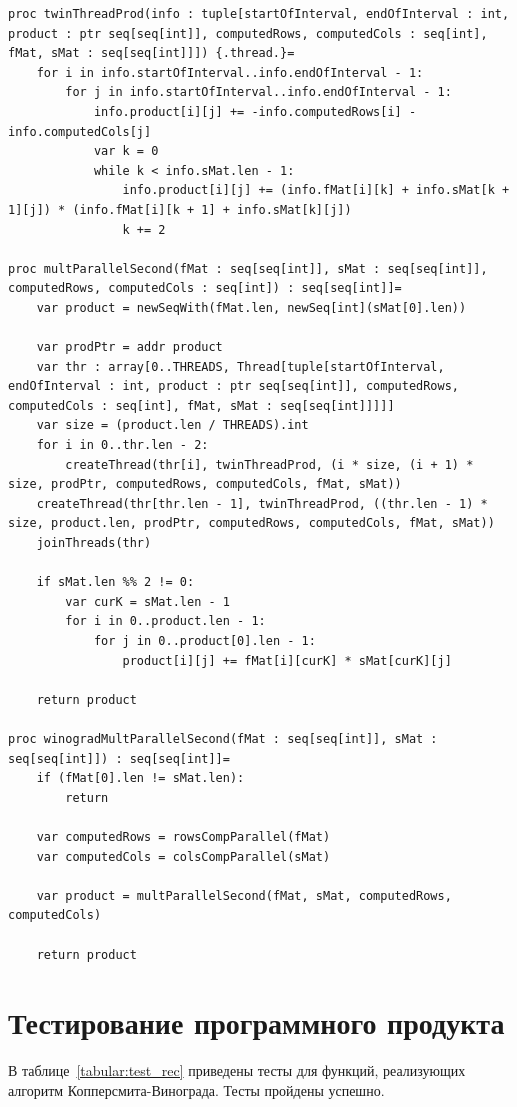 \documentclass[12pt]{report}
\begin{document}
\begin{lstlisting}[caption=Реализация второй схемы параллельного алгоритма Копперсмита-Винограда,
label={list:paral2}]
proc twinThreadProd(info : tuple[startOfInterval, endOfInterval : int, product : ptr seq[seq[int]], computedRows, computedCols : seq[int], fMat, sMat : seq[seq[int]]]) {.thread.}=
    for i in info.startOfInterval..info.endOfInterval - 1:
        for j in info.startOfInterval..info.endOfInterval - 1:
            info.product[i][j] += -info.computedRows[i] - info.computedCols[j]
            var k = 0
            while k < info.sMat.len - 1:
                info.product[i][j] += (info.fMat[i][k] + info.sMat[k + 1][j]) * (info.fMat[i][k + 1] + info.sMat[k][j])
                k += 2

proc multParallelSecond(fMat : seq[seq[int]], sMat : seq[seq[int]], computedRows, computedCols : seq[int]) : seq[seq[int]]=
    var product = newSeqWith(fMat.len, newSeq[int](sMat[0].len))

    var prodPtr = addr product
    var thr : array[0..THREADS, Thread[tuple[startOfInterval, endOfInterval : int, product : ptr seq[seq[int]], computedRows, computedCols : seq[int], fMat, sMat : seq[seq[int]]]]]
    var size = (product.len / THREADS).int
    for i in 0..thr.len - 2:
        createThread(thr[i], twinThreadProd, (i * size, (i + 1) * size, prodPtr, computedRows, computedCols, fMat, sMat))
    createThread(thr[thr.len - 1], twinThreadProd, ((thr.len - 1) * size, product.len, prodPtr, computedRows, computedCols, fMat, sMat))
    joinThreads(thr)

    if sMat.len %% 2 != 0:
        var curK = sMat.len - 1
        for i in 0..product.len - 1:
            for j in 0..product[0].len - 1:
                product[i][j] += fMat[i][curK] * sMat[curK][j]

    return product

proc winogradMultParallelSecond(fMat : seq[seq[int]], sMat : seq[seq[int]]) : seq[seq[int]]=
    if (fMat[0].len != sMat.len):
        return

    var computedRows = rowsCompParallel(fMat)
    var computedCols = colsCompParallel(sMat)

    var product = multParallelSecond(fMat, sMat, computedRows, computedCols)

    return product
\end{lstlisting}

\section{Тестирование программного продукта}
В таблице~\ref{tabular:test_rec} приведены тесты для функций, реализующих алгоритм Копперсмита-Винограда. Тесты пройдены успешно.
\end{document}

